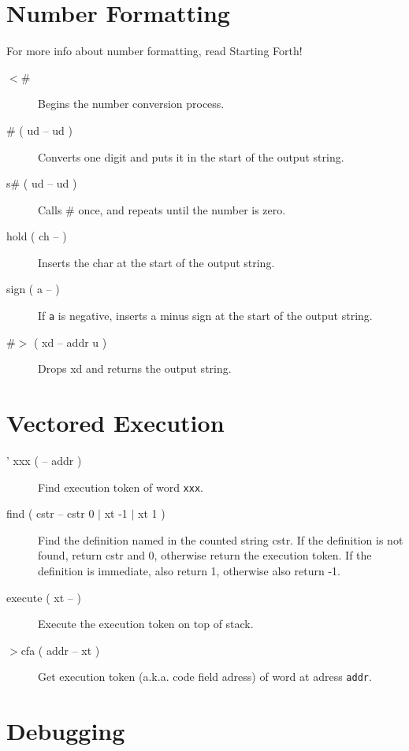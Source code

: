 \section{Number Formatting}

For more info about number formatting, read Starting Forth!

\begin{description}

\item[$<$\#] Begins the number conversion process.
\item[\# ( ud -- ud )] Converts one digit and puts it in the start of the output string.
\item[s\# ( ud -- ud )] Calls \# once, and repeats until the number is zero.
\item[hold ( ch -- )] Inserts the char at the start of the output string.
\item[sign ( a -- )] If \texttt{a} is negative, inserts a minus sign at the start of the output string.
\item[\#$>$ ( xd -- addr u )] Drops xd and returns the output string.

\end{description}

\section{Vectored Execution}

\begin{description}
\item[' xxx ( -- addr )] Find execution token of word \texttt{xxx}.
\item[find ( cstr -- cstr 0 $\vert$ xt -1 $\vert$ xt 1 )] Find the definition named in the counted string cstr. If the definition is not found, return cstr and 0, otherwise return the execution token. If the definition is immediate, also return 1, otherwise also return -1.
\item[execute ( xt -- )] Execute the execution token on top of stack.
\item[$>$cfa ( addr -- xt )] Get execution token (a.k.a. code field adress) of word at adress \texttt{addr}.

\end{description}

\section{Debugging}

